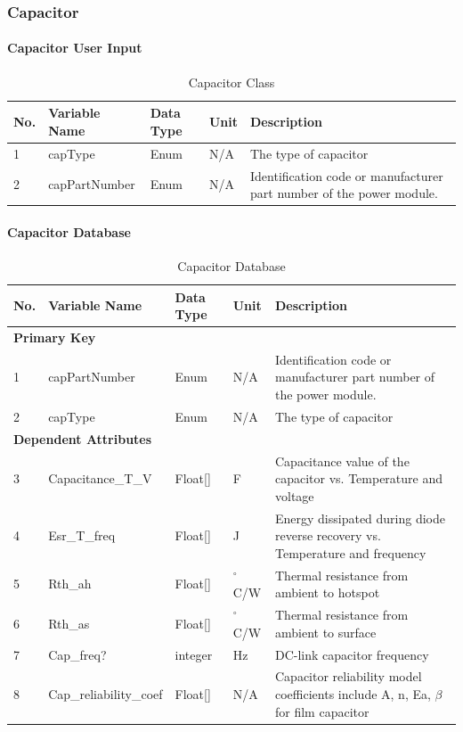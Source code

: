\documentclass{article}
\begin{document}
\subsubsection{Capacitor}
\paragraph{Capacitor User Input}
\begin{table}[h]
\centering
\caption{Capacitor Class}
\begin{tabular}{|l|l|l|l|p{6cm}|}
\hline
\textbf{No.} & \textbf{Variable Name} & \textbf{Data Type} & \textbf{Unit} & \textbf{Description} \\ \hline
1 & capType & Enum & N/A & The type of capacitor \\ \hline
2 & capPartNumber & Enum & N/A & Identification code or manufacturer part number of the power module. \\ \hline
\end{tabular}
\end{table}

\paragraph{Capacitor Database}
\begin{table}[h]
\centering
\caption{Capacitor Database}
\begin{tabular}{|l|l|l|l|p{6cm}|}
\hline
\textbf{No.} & \textbf{Variable Name} & \textbf{Data Type} & \textbf{Unit} & \textbf{Description} \\ \hline
\multicolumn{5}{|l|}{\textbf{Primary Key}} \\ \hline
1 & capPartNumber & Enum & N/A & Identification code or manufacturer part number of the power module. \\ \hline
2 & capType & Enum & N/A & The type of capacitor \\ \hline
\multicolumn{5}{|l|}{\textbf{Dependent Attributes}} \\ \hline
3 & Capacitance\_T\_V & Float[] & F & Capacitance value of the capacitor vs. Temperature and voltage \\ \hline
4 & Esr\_T\_freq & Float[] & J & Energy dissipated during diode reverse recovery vs. Temperature and frequency \\ \hline
5 & Rth\_ah & Float[] & $^\circ$C/W & Thermal resistance from ambient to hotspot \\ \hline
6 & Rth\_as & Float[] & $^\circ$C/W & Thermal resistance from ambient to surface \\ \hline
7 & Cap\_freq? & integer & Hz & DC-link capacitor frequency \\ \hline
8 & Cap\_reliability\_coef & Float[] & N/A & Capacitor reliability model coefficients include A, n, Ea, $\beta$ for film capacitor \\ \hline
\end{tabular}
\end{table}
\end{document}
